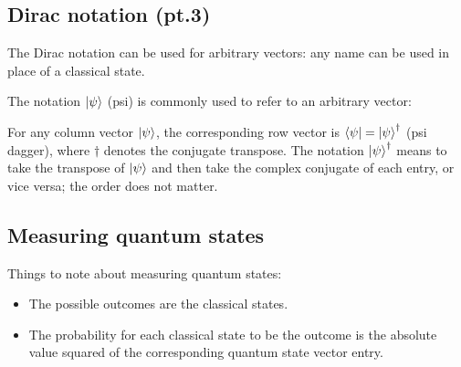 \documentclass{report}
\begin{document}
\subsection{Dirac notation (pt.3)}
The Dirac notation can be used for arbitrary vectors: any name can be used in place of a classical state.

The notation $\ket{\psi}$ (psi) is commonly used to refer to an arbitrary vector:

\newpage

\begin{note}
    For any column vector $\ket{\psi}$, the corresponding row vector is $\bra{\psi}=\ket{\psi}^\dagger$ (psi dagger), where $\dagger$ denotes the conjugate transpose. The notation $\ket{\psi}^\dagger$ means to take the transpose of $\ket{\psi}$ and then take the complex conjugate of each entry, or vice versa; the order does not matter.
\end{note}

\subsection{Measuring quantum states}
Things to note about measuring quantum states:
\begin{itemize}
    \item The possible outcomes are the classical states.
    \item The probability for each classical state to be the outcome is the absolute value squared of the corresponding quantum state vector entry.
\end{itemize}
\end{document}
